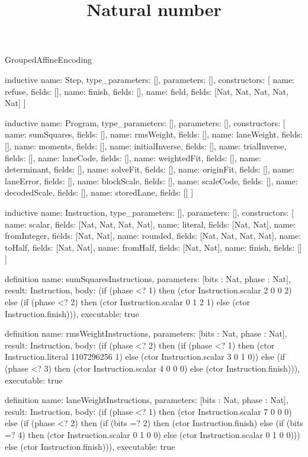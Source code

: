 \begin{lexlean}{GroupedAffineEncoding}
\title{Natural number}
\begin{semanticmodule}
inductive{
  name: Step,
  type_parameters: [],
  parameters: [],
  constructors: [
    {name: refuse, fields: []},
    {name: finish, fields: []},
    {name: field, fields: [Nat, Nat, Nat, Nat, Nat]}
  ]
}

inductive{
  name: Program,
  type_parameters: [],
  parameters: [],
  constructors: [
    {name: sumSquares, fields: []},
    {name: rmsWeight, fields: []},
    {name: laneWeight, fields: []},
    {name: moments, fields: []},
    {name: initialInverse, fields: []},
    {name: trialInverse, fields: []},
    {name: laneCode, fields: []},
    {name: weightedFit, fields: []},
    {name: determinant, fields: []},
    {name: solveFit, fields: []},
    {name: originFit, fields: []},
    {name: laneError, fields: []},
    {name: blockScale, fields: []},
    {name: scaleCode, fields: []},
    {name: decodedScale, fields: []},
    {name: storedLane, fields: []}
  ]
}

inductive{
  name: Instruction,
  type_parameters: [],
  parameters: [],
  constructors: [
    {name: scalar, fields: [Nat, Nat, Nat, Nat]},
    {name: literal, fields: [Nat, Nat]},
    {name: fromInteger, fields: [Nat, Nat]},
    {name: rounded, fields: [Nat, Nat, Nat, Nat]},
    {name: toHalf, fields: [Nat, Nat]},
    {name: fromHalf, fields: [Nat, Nat]},
    {name: finish, fields: []}
  ]
}

definition{
  name: sumSquaresInstructions,
  parameters: [bits : Nat, phase : Nat],
  result: Instruction,
  body: (if (phase <? 1) then (ctor Instruction.scalar 2 0 0 2) else (if (phase <? 2) then (ctor Instruction.scalar 0 1 2 1) else (ctor Instruction.finish))),
  executable: true
}

definition{
  name: rmsWeightInstructions,
  parameters: [bits : Nat, phase : Nat],
  result: Instruction,
  body: (if (phase <? 2) then (if (phase <? 1) then (ctor Instruction.literal 1107296256 1) else (ctor Instruction.scalar 3 0 1 0)) else (if (phase <? 3) then (ctor Instruction.scalar 4 0 0 0) else (ctor Instruction.finish))),
  executable: true
}

definition{
  name: laneWeightInstructions,
  parameters: [bits : Nat, phase : Nat],
  result: Instruction,
  body: (if (phase <? 1) then (ctor Instruction.scalar 7 0 0 0) else (if (phase <? 2) then (if (bits =? 2) then (ctor Instruction.finish) else (if (bits =? 4) then (ctor Instruction.scalar 0 1 0 0) else (ctor Instruction.scalar 0 1 0 0))) else (ctor Instruction.finish))),
  executable: true
}


\end{semanticmodule}
\end{lexlean}
